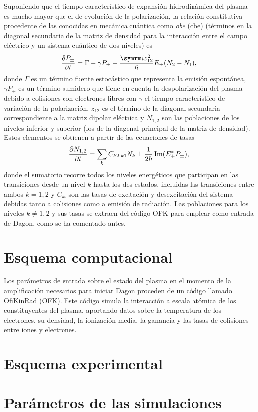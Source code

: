 Suponiendo que el tiempo característico de expansión hidrodinámica del plasma es mucho mayor que el de evolución de la polarización, la relación constitutiva procedente de las conocidas en mecánica cuántica como \emph{\acrlong{obe}} (\acrshort{obe}) (términos en la diagonal secundaria de la matriz de densidad para la interacción entre el campo eléctrico y un sistema cuántico de dos niveles) es
\begin{equation}
  \pdv{P_{\pm }}{t} = \Gamma - \gamma P_{\pm } - \frac{\iu z^{2}_{12}}{\hslash }E_{\pm }(N_{2}-N_{1}),
\end{equation}
donde $\Gamma$ es un término fuente estocástico que representa la emisión espontánea, $\gamma P_{\pm}$ es un término sumidero que tiene en cuenta la despolarización del plasma debido a colisiones con electrones libres con $\gamma$ el tiempo característico de variación de la polarización, $z_{12}$ es el término de la diagonal secundaria correspondiente a la matriz dipolar eléctrica y $N_{1,2}$ son las poblaciones de los niveles inferior y superior (los de la diagonal principal de la matriz de densidad). Estos elementos se obtienen a partir de las ecuaciones de tasas
\begin{equation}
  \frac{\partial N_{1,2}}{\partial t} = \sum_{k} C_{k2,k1}N_{k} \pm \frac{1}{2 \hslash }\operatorname{Im} (E_{\pm }^{*}P_{\pm }),
\end{equation}
\noindent
donde el sumatorio recorre todos los niveles energéticos que participan en las transiciones desde un nivel $k$ hasta los dos estados, incluidas las transiciones entre ambos $k=1, 2$ y $C_{ki}$ son las tasas de excitación y desexcitación del sistema debidas tanto a colisiones como a emisión de radiación. Las poblaciones para los niveles $k\neq 1, 2$ y sus tasas se extraen del código OFK para emplear como entrada de Dagon, como se ha comentado antes.

\section{Esquema computacional}\label{sec:3.2}
Los parámetros de entrada sobre el estado del plasma en el momento de la amplificación necesarios para iniciar Dagon proceden de un código llamado OfiKinRad (OFK). Este código simula la interacción a escala atómica de los constituyentes del plasma, aportando datos sobre la temperatura de los electrones, su densidad, la ionización media, la ganancia y las tasas de colisiones entre iones y electrones.

\section{Esquema experimental}\label{sec:3.3}

\section{Parámetros de las simulaciones}\label{sec:3.4}
